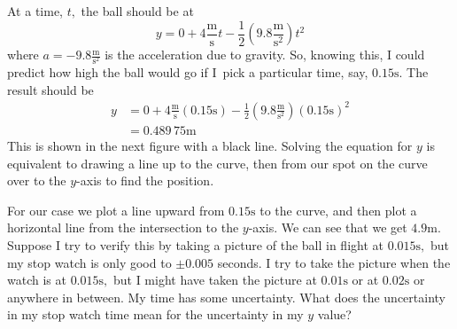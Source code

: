 \documentclass{book}
\begin{document}
At a time, $t,$ the ball should be at
\[
y=0+4\frac{
\text{m}
}{
\text{s}
}t-\frac{1}{2}\left(  9.8\frac{
\text{m}
}{
\text{s}
^{2}}\right)  t^{2}
\]
where $a=-9.8\frac{
\text{m}
}{
\text{s}
^{2}}$ is the acceleration due to gravity. So, knowing this, I could predict
how high the ball would go if I\ pick a particular time, say, $0.15
\text{s}
.$ The result should be
\begin{align*}
y  & =0+4\frac{
\text{m}
}{
\text{s}
}\left(  0.15
\text{s}
\right)  -\frac{1}{2}\left(  9.8\frac{
\text{m}
}{
\text{s}
^{2}}\right)  \left(  0.15
\text{s}
\right)  ^{2}\\
& =0.489\,75
\text{m}
\end{align*}
This is shown in the next figure with a black line. Solving the equation for
$y$ is equivalent to drawing a line up to the curve, then from our spot on the
curve over to the $y$-axis to find the position.
\begin{center}
\end{center}


For our case we plot a line upward from $0.15
\text{s}
$ to the curve, and then plot a horizontal line from the intersection to the
$y$-axis. We can see that we get $4.9
\text{m}
.$ Suppose I try to verify this by taking a picture of the ball in flight at
$0.015
\text{s}
,$ but my stop watch is only good to $\pm0.005$ seconds. I try to take the
picture when the watch is at $0.015
\text{s}
,$ but I might have taken the picture at $0.01
\text{s}
$ or at $0.02
\text{s}
$ or anywhere in between. My time has some uncertainty. What does the
uncertainty in my stop watch time mean for the uncertainty in my $y$ value?
\end{document}
